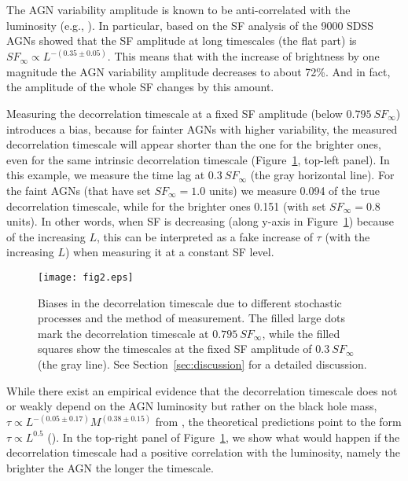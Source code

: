 \documentclass[twocolumn]{aastex6}
\begin{document}
The AGN variability amplitude is known to be anti-correlated with the luminosity (e.g., \citealt{1972IAUS...44..171A,1976AJ.....81..905U,1994MNRAS.268..305H,1994A&A...291...74P,1999MNRAS.306..637G}). 
In particular, \cite{2016ApJ...826..118K} based on the SF analysis of the 9000 SDSS AGNs
showed that the SF amplitude at long timescales (the flat part) is $SF_\infty\propto L^{-(0.35\pm0.05)}$. This means that with the increase 
of brightness by one magnitude the AGN variability amplitude decreases to about 72\%. And in fact, the amplitude of the whole SF changes by this amount.

Measuring the decorrelation timescale at a fixed SF amplitude (below $0.795~SF_\infty$) introduces a bias, because for fainter 
AGNs with higher variability, the measured decorrelation timescale will appear shorter than the one for the brighter ones, 
even for the same intrinsic decorrelation timescale (Figure~\ref{fig:SF3}, top-left panel).
In this example, we measure the time lag at $0.3~SF_\infty$ (the gray horizontal line). For the 
faint AGNs (that have set $SF_\infty=1.0$ units) we measure 0.094 of the true decorrelation timescale, while for the brighter ones 0.151 (with set $SF_\infty=0.8$ units).
In other words, when SF is decreasing (along y-axis in Figure~\ref{fig:SF3}) because of the increasing $L$, 
this can be interpreted as a fake increase of $\tau$ (with the increasing $L$) when measuring it at a constant SF level.

\begin{figure}
\centering
\texttt{[image: fig2.eps]}
\caption{Biases in the decorrelation timescale due to different stochastic processes and the method of measurement. The filled large dots
mark the decorrelation timescale at $0.795~SF_\infty$, while the filled squares show the timescales at the fixed SF amplitude of $0.3~SF_\infty$ (the gray line).
See Section~\ref{sec:discussion} for a detailed discussion.}
\label{fig:SF3}
\end{figure}

While there exist an empirical evidence that the decorrelation timescale does not or weakly depend on the AGN luminosity but rather on the black hole mass, 
$\tau\propto L^{-(0.05\pm0.17)}M^{(0.38\pm0.15)}$ from \cite{2016ApJ...826..118K},
the theoretical predictions point to the form $\tau\propto L^{0.5}$ (\citealt{2002apa..book.....F}). In the top-right panel of Figure~\ref{fig:SF3}, we show what would happen if the 
decorrelation timescale had a positive correlation with the luminosity, namely the brighter the AGN the longer the timescale.
\end{document}
